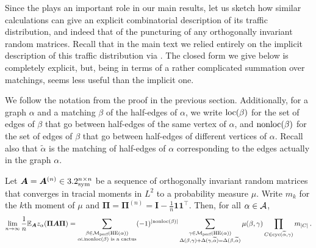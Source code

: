 Since the \rrom plays an important role in our main results, let us sketch how similar calculations can give an explicit combinatorial description of its traffic distribution, and indeed that of the puncturing of any orthogonally invariant random matrices.
Recall that in the main text we relied entirely on the implicit description of this traffic distribution via .
The closed form we give below is completely explicit, but, being in terms of a rather complicated summation over matchings, seems less useful than the implicit one.

We follow the notation from the proof in the previous section.
Additionally, for a graph $\alpha$ and a matching $\beta$ of the half-edges of $\alpha$, we write $\mathrm{loc}(\beta)$ for the set of edges of $\beta$ that go between half-edges of the same vertex of $\alpha$, and $\mathrm{nonloc}(\beta)$ for the set of edges of $\beta$ that go between half-edges of different vertices of $\alpha$.
Recall also that $\widetilde{\alpha}$ is the matching of half-edges of $\alpha$ corresponding to the edges actually in the graph $\alpha$.
\begin{theorem}
    Let ${\bm A} = {\bm A}^{(n)} \in 3.2^{n \times n}_{\mathrm{sym}}$ be a sequence of orthogonally invariant random matrices that converges in tracial moments in $L^2$ to a probability measure $\mu$.
    Write $m_k$ for the $k$th moment of $\mu$ and $\bm\Pi = \bm\Pi^{(n)} = \bm I - \frac{1}{n}\bm 1 \bm 1^{\top}$.
    Then, for all $\alpha \in {\cal A}$,
    \[ \lim_{n \to \infty} \frac{1}{n}\mathbb{E}_{{\bm A}} z_{\alpha}(\bm \Pi{\bm A}\bm \Pi) = \sum_{\substack{\beta \in \mathcal{M}_{\textnormal{perf}}(\mathrm{HE}(\alpha)) \\ \alpha \sqcup \mathrm{nonloc}(\beta) \text{ is a cactus}}} (-1)^{|\mathrm{nonloc}(\beta)|} \sum_{\substack{\gamma \in \mathcal{M}_{\textnormal{perf}}(\mathrm{HE}(\alpha)) \\ \Delta(\beta, \gamma) + \Delta(\gamma, \widetilde{\alpha}) = \Delta(\beta, \widetilde{\alpha})}} \mu(\beta, \gamma) \prod_{C \in \mathrm{cyc}(\widetilde{\alpha}, \gamma)} m_{|C|}\,. \]
\end{theorem}
